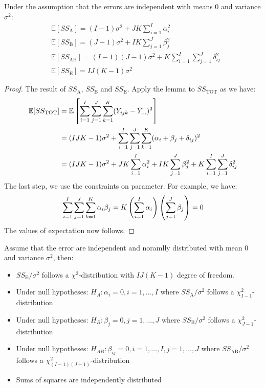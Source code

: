 \begin{proposition}
    Under the assumption that the errors are independent with means $0$ and variance $\sigma^2$:
    \begin{equation*}
    \begin{aligned}
        &\mathbb{E}[SS_\text{A}] = (I-1)\sigma^2 + JK\sum^I_{i=1}\alpha_i^2  \\
        &\mathbb{E}[SS_\text{B}] = (J-1)\sigma^2 + IK\sum^J_{j=1}\beta^2_j \\
        &\mathbb{E}[SS_\text{AB}] = (I-1)(J-1)\sigma^2 + K\sum^I_{i=1}\sum^J_{j=1}\delta^2_{ij} \\
        &\mathbb{E}[SS_\text{E}] = IJ(K-1)\sigma^2
    \end{aligned}
    \end{equation*}
\end{proposition}
\begin{proof}
    The result of $SS_\text{A}$, $SS_\text{B}$ and $SS_\text{E}$. Apply the lemma to $SS_\text{TOT}$ as we have:
    \begin{equation*}
    \begin{aligned}
        \mathbb{E}[SS_\text{TOT}] &= \mathbb{E}\left[ \sum^I_{i=1}\sum^J_{j=1}\sum^K_{k=1}(Y_{ijk} - \bar{Y}_{...})^2 \right]  \\
        &= (IJK-1)\sigma^2 + \sum^I_{i=1}\sum^J_{j=1}\sum^K_{k=1}(\alpha_i + \beta_j + \delta_{ij})^2 \\
        &= (IJK - 1)\sigma^2 + JK\sum^I_{i=1}\alpha_i^2 + IK\sum^J_{j=1}\beta^2_j + K\sum^I_{i=1}\sum^J_{j=1}\delta_{ij}^2
    \end{aligned}
    \end{equation*}
    The last step, we use the constraints on parameter. For example, we have:
    \begin{equation*}
        \sum^I_{i=1}\sum^J_{j=1}\sum^K_{k=1}\alpha_i\beta_j = K\left( \sum^I_{i=1}\alpha_i \right)\left( \sum^J_{j=1}\beta_j \right) = 0
    \end{equation*}
    The values of expectation now follows.
\end{proof}

\begin{theorem}
    Assume that the error are independent and noramlly distributed with mean $0$ and variance $\sigma^2$, then:
    \begin{itemize}
        \item $SS_\text{E}/\sigma^2$ follows a $\chi^2$-distribution with $IJ(K-1)$ degree of freedom. 
        \item Under null hypotheses: $H_A : \alpha_i = 0, i=1,\dots,I$ where $SS_\text{A}/\sigma^2$ follows a $\chi^2_{I-1}$-distribution 
        \item Under null hypotheses: $H_B : \beta_j = 0, j=1,\dots,J$ where $SS_\text{B}/\sigma^2$ follows a $\chi^2_{J-1}$-distribution
        \item Under null hypotheses: $H_{AB} : \beta_{ij} = 0, i=1,\dots,I, j=1,\dots,J$ where $SS_\text{AB}/\sigma^2$ follows a $\chi^2_{(I-1)(J-1)}$-distribution
        \item Sums of squares are independently distributed
    \end{itemize}
\end{theorem}

